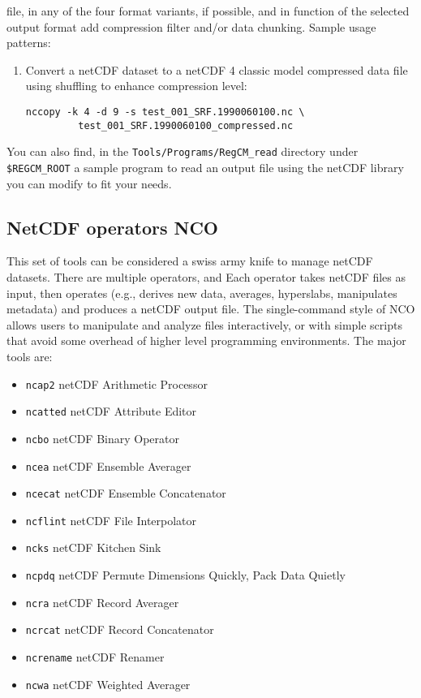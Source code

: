 \begin{itemize}
file, in any of the four format variants, if possible, and in function of
the selected output format add compression filter and/or data chunking.
Sample usage patterns:
\begin{enumerate}
\item Convert a netCDF dataset to a netCDF 4 classic model compressed
data file using shuffling to enhance compression level:
\begin{Verbatim}
nccopy -k 4 -d 9 -s test_001_SRF.1990060100.nc \
         test_001_SRF.1990060100_compressed.nc
\end{Verbatim}
\end{enumerate}
\end{itemize}

You can also find, in the \verb=Tools/Programs/RegCM_read= directory
under \verb=$REGCM_ROOT= a sample program to read an output file using
the netCDF library you can modify to fit your needs.

\subsection{NetCDF operators NCO}

This set of tools can be considered a swiss army knife to manage netCDF
datasets. There are multiple operators, and Each operator takes netCDF
files as input, then operates (e.g., derives new data, averages, hyperslabs,
manipulates metadata) and produces a netCDF output file.
The single-command style of NCO allows users to manipulate and analyze files
interactively, or with simple scripts that avoid some overhead of higher level
programming environments.
The major tools are:
\begin{itemize}
\item \verb=ncap2= netCDF Arithmetic Processor 
\item \verb=ncatted= netCDF Attribute Editor
\item \verb=ncbo= netCDF Binary Operator
\item \verb=ncea= netCDF Ensemble Averager
\item \verb=ncecat= netCDF Ensemble Concatenator
\item \verb=ncflint= netCDF File Interpolator
\item \verb=ncks= netCDF Kitchen Sink
\item \verb=ncpdq= netCDF Permute Dimensions Quickly, Pack Data Quietly
\item \verb=ncra= netCDF Record Averager
\item \verb=ncrcat= netCDF Record Concatenator
\item \verb=ncrename= netCDF Renamer
\item \verb=ncwa= netCDF Weighted Averager
\end{itemize}

